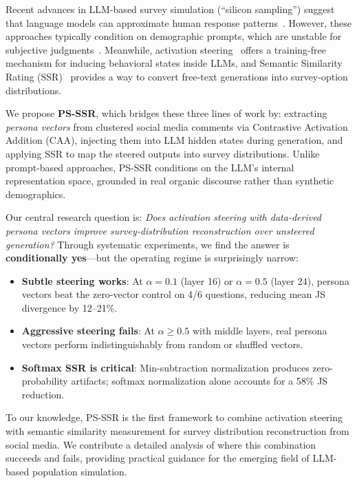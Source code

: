 \documentclass[letterpaper]{article}
\newcommand{\method}{PS-SSR}
\begin{document}
Recent advances in LLM-based survey simulation (``silicon sampling'') suggest that language models can approximate human response patterns~\citep{argyle2023out,aher2023using}. However, these approaches typically condition on demographic prompts, which are unstable for subjective judgments~\citep{sun2025sociodemographic,santurkar2023whose}. Meanwhile, activation steering~\citep{turner2024activation,panickssery2024steering} offers a training-free mechanism for inducing behavioral states inside LLMs, and Semantic Similarity Rating (SSR)~\citep{maier2025llms} provides a way to convert free-text generations into survey-option distributions.

We propose \textbf{\method{}}, which bridges these three lines of work by: extracting \emph{persona vectors} from clustered social media comments via Contrastive Activation Addition (CAA), injecting them into LLM hidden states during generation, and applying SSR to map the steered outputs into survey distributions. Unlike prompt-based approaches, \method{} conditions on the LLM's internal representation space, grounded in real organic discourse rather than synthetic demographics.

Our central research question is: \emph{Does activation steering with data-derived persona vectors improve survey-distribution reconstruction over unsteered generation?} Through systematic experiments, we find the answer is \textbf{conditionally yes}---but the operating regime is surprisingly narrow:

\begin{itemize}[nosep,leftmargin=*]
    \item \textbf{Subtle steering works}: At $\alpha = 0.1$ (layer 16) or $\alpha = 0.5$ (layer 24), persona vectors beat the zero-vector control on 4/6 questions, reducing mean JS divergence by 12--21\%.
    \item \textbf{Aggressive steering fails}: At $\alpha \geq 0.5$ with middle layers, real persona vectors perform indistinguishably from random or shuffled vectors.
    \item \textbf{Softmax SSR is critical}: Min-subtraction normalization produces zero-probability artifacts; softmax normalization alone accounts for a 58\% JS reduction.
\end{itemize}

To our knowledge, \method{} is the first framework to combine activation steering with semantic similarity measurement for survey distribution reconstruction from social media. We contribute a detailed analysis of where this combination succeeds and fails, providing practical guidance for the emerging field of LLM-based population simulation.
\end{document}
